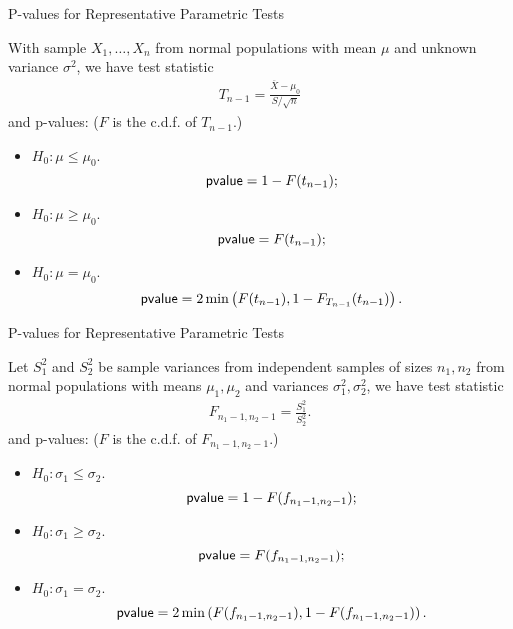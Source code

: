 \begin{frame}{P-values for Representative Parametric Tests}

 With sample $X_1, \ldots, X_n$ from normal populations with mean $\mu$ and unknown variance $\sigma^2$, we have test statistic
\begin{align*}
T_{n-1} = \frac{\overline{X}-\mu_0}{S/\sqrt{n}}
\end{align*}
and p-values: ($F$ is the c.d.f. of $T_{n-1}$.)
\begin{itemize}
	\item \underline{$H_0: \mu \leq \mu_0$}. $$\mathsf{pvalue} = 1 - F(t_{n-1});$$
	\item \underline{$H_0: \mu \geq \mu_0$}. $$\mathsf{pvalue} = F(t_{n-1});$$
	\item \underline{$H_0: \mu = \mu_0$}. $$\mathsf{pvalue} = 2\min \left(F(t_{n-1}), 1 - F_{T_{n-1}}(t_{n-1})\right).$$
\end{itemize}

\end{frame}


\begin{frame}{P-values for Representative Parametric Tests}

 Let $S_1^2$ and $S_2^2$ be sample variances from independent samples of sizes $n_1, n_2$ from normal populations with means $\mu_1, \mu_2$ and variances $\sigma_1^2, \sigma_2^2$, we have test statistic
\begin{align*}
F_{n_1-1, n_2-1} = \frac{S_1^2}{S_2^2}.
\end{align*}
and p-values: ($F$ is the c.d.f. of $F_{n_1-1,n_2-1}$.)
\begin{itemize}
	\item \underline{$H_0: \sigma_1 \leq \sigma_2$}. $$\mathsf{pvalue} = 1 - F(f_{n_1-1,n_2-1});$$
	\item \underline{$H_0: \sigma_1 \geq \sigma_2$}. $$\mathsf{pvalue} = F(f_{n_1-1,n_2-1});$$
	\item \underline{$H_0: \sigma_1 = \sigma_2$}. $$\mathsf{pvalue} = 2\min \left(F(f_{n_1-1,n_2-1}), 1 - F(f_{n_1-1,n_2-1})\right).$$
\end{itemize}


\end{frame}


